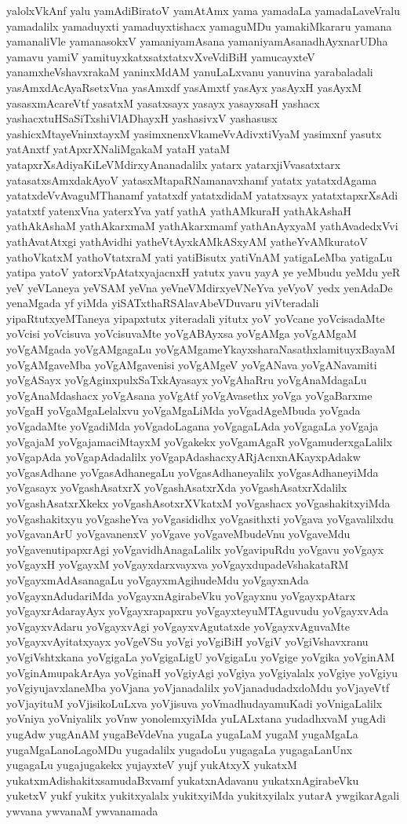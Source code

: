 {yalolxVkAnf
yalu
yamAdiBiratoV
yamAtAmx
yama
yamadaLa
yamadaLaveVralu
yamadalilx
yamaduyxti
yamaduyxtishacx
yamaguMDu
yamakiMkararu
yamana
yamanaliVle
yamanasokxV
yamaniyamAsana
yamaniyamAsanadhAyxnarUDha
yamavu
yamiV
yamituyxkatxsatxtatxvXveVdiBiH
yamucayxteV
yanamxheVshavxrakaM
yaninxMdAM
yanuLaLxvanu
yanuvina
yarabaladali
yasAmxdAcAyaRsetxVna
yasAmxdf
yasAmxtf
yasAyx
yasAyxH
yasAyxM
yasasxmAcareVtf
yasatxM
yasatxsayx
yasayx
yasayxsaH
yashacx
yashacxtuHSaSiTxshiVlADhayxH
yashasivxV
yashasusx
yashicxMtayeVninxtayxM
yasimxnenxVkameVvAdivxtiVyaM
yasimxnf
yasutx
yatAnxtf
yatApxrXNaliMgakaM
yataH
yataM
yatapxrXsAdiyaKiLeVMdirxyAnanadalilx
yatarx
yatarxjiVvasatxtarx
yatasatxsAmxdakAyoV
yatasxMtapaRNamanavxhamf
yatatx
yatatxdAgama
yatatxdeVvAvaguMThanamf
yatatxdf
yatatxdidaM
yatatxsayx
yatatxtapxrXsAdi
yatatxtf
yatenxVna
yaterxYva
yatf
yathA
yathAMkuraH
yathAkAshaH
yathAkAshaM
yathAkarxmaM
yathAkarxmamf
yathAnAyxyaM
yathAvadedxVvi
yathAvatAtxgi
yathAvidhi
yatheVtAyxkAMkASxyAM
yatheYvAMkuratoV
yathoVkatxM
yathoVtatxraM
yati
yatiBisutx
yatiVnAM
yatigaLeMba
yatigaLu
yatipa
yatoV
yatorxVpAtatxyajacnxH
yatutx
yavu
yayA
ye
yeMbudu
yeMdu
yeR
yeV
yeVLaneya
yeVSAM
yeVna
yeVneVMdirxyeVNeYva
yeVyoV
yedx
yenAdaDe
yenaMgada
yf
yiMda
yiSATxthaRSAlavAbeVDuvaru
yiVteradali
yipaRtutxyeMTaneya
yipapxtutx
yiteradali
yitutx
yoV
yoVcane
yoVcisadaMte
yoVcisi
yoVcisuva
yoVcisuvaMte
yoVgABAyxsa
yoVgAMga
yoVgAMgaM
yoVgAMgada
yoVgAMgagaLu
yoVgAMgameYkayxsharaNasathxlamituyxBayaM
yoVgAMgaveMba
yoVgAMgavenisi
yoVgAMgeV
yoVgANava
yoVgANavamiti
yoVgASayx
yoVgAginxpulxSaTxkAyasayx
yoVgAhaRru
yoVgAnaMdagaLu
yoVgAnaMdashacx
yoVgAsana
yoVgAtf
yoVgAvasethx
yoVga
yoVgaBarxme
yoVgaH
yoVgaMgaLelalxvu
yoVgaMgaLiMda
yoVgadAgeMbuda
yoVgada
yoVgadaMte
yoVgadiMda
yoVgadoLagana
yoVgagaLAda
yoVgagaLa
yoVgaja
yoVgajaM
yoVgajamaciMtayxM
yoVgakekx
yoVgamAgaR
yoVgamuderxgaLalilx
yoVgapAda
yoVgapAdadalilx
yoVgapAdashacxyARjAcnxnAKayxpAdakw
yoVgasAdhane
yoVgasAdhanegaLu
yoVgasAdhaneyalilx
yoVgasAdhaneyiMda
yoVgasayx
yoVgashAsatxrX
yoVgashAsatxrXda
yoVgashAsatxrXdalilx
yoVgashAsatxrXkekx
yoVgashAsotxrXVkatxM
yoVgashacx
yoVgashakitxyiMda
yoVgashakitxyu
yoVgasheYva
yoVgasididhx
yoVgasithxti
yoVgava
yoVgavalilxdu
yoVgavanArU
yoVgavanenxV
yoVgave
yoVgaveMbudeVnu
yoVgaveMdu
yoVgavenutipapxrAgi
yoVgavidhAnagaLalilx
yoVgavipuRdu
yoVgavu
yoVgayx
yoVgayxH
yoVgayxM
yoVgayxdarxvayxva
yoVgayxdupadeVshakataRM
yoVgayxmAdAsanagaLu
yoVgayxmAgihudeMdu
yoVgayxnAda
yoVgayxnAdudariMda
yoVgayxnAgirabeVku
yoVgayxnu
yoVgayxpAtarx
yoVgayxrAdarayAyx
yoVgayxrapapxru
yoVgayxteyuMTAguvudu
yoVgayxvAda
yoVgayxvAdaru
yoVgayxvAgi
yoVgayxvAgutatxde
yoVgayxvAguvaMte
yoVgayxvAyitatxyayx
yoVgeVSu
yoVgi
yoVgiBiH
yoVgiV
yoVgiVshavxranu
yoVgiVshtxkana
yoVgigaLa
yoVgigaLigU
yoVgigaLu
yoVgige
yoVgika
yoVginAM
yoVginAmupakArAya
yoVginaH
yoVgiyAgi
yoVgiya
yoVgiyalalx
yoVgiye
yoVgiyu
yoVgiyujavxlaneMba
yoVjana
yoVjanadalilx
yoVjanadudadxdoMdu
yoVjayeVtf
yoVjayituM
yoVjisikoLuLxva
yoVjisuva
yoVmadhudayamuKadi
yoVnigaLalilx
yoVniya
yoVniyalilx
yoVnw
yonolemxyiMda
yuLALxtana
yudadhxvaM
yugAdi
yugAdw
yugAnAM
yugaBeVdeVna
yugaLa
yugaLaM
yugaM
yugaMgaLa
yugaMgaLanoLagoMDu
yugadalilx
yugadoLu
yugagaLa
yugagaLanUnx
yugagaLu
yugajugakekx
yujayxteV
yujf
yukAtxyX
yukatxM
yukatxmAdishakitxsamudaBxvamf
yukatxnAdavanu
yukatxnAgirabeVku
yuketxV
yukf
yukitx
yukitxyalalx
yukitxyiMda
yukitxyilalx
yutarA
ywgikarAgali
ywvana
ywvanaM
ywvanamada
}

